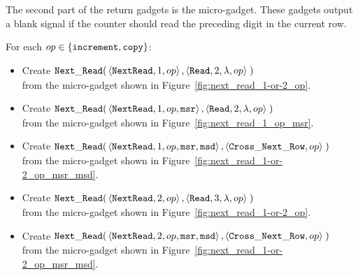 The second part of the return gadgets is the {\readnext} micro-gadget. These gadgets output a blank {\cwrite}
signal if the counter should read the preceding digit in the current row.


For each $op\in \{ {\tt increment}, {\tt copy} \}$:
\begin{itemize}

    \item Create
    $\begin{aligned}[t]
        {\tt Next\_Read}(& \left\langle {\tt NextRead}, 1,          op \right\rangle,
                    \left\langle {\tt Read},     2, \lambda, op \right\rangle \;)
    \end{aligned}$\\from the micro-gadget shown in Figure~\ref{fig:next_read_1-or-2_op}.

    \item Create
    $\begin{aligned}[t]
        {\tt Next\_Read}(& \left\langle {\tt NextRead}, 1,          op, {\tt msr} \right\rangle,
                    \left\langle {\tt Read},     2, \lambda, op            \right\rangle \;)
    \end{aligned}$\\from the micro-gadget shown in Figure~\ref{fig:next_read_1_op_msr}.

    \item Create
    $\begin{aligned}[t]
        {\tt Next\_Read}(& \left\langle {\tt NextRead}, 1,      op, {\tt msr}, {\tt msd} \right\rangle,
                    \left\langle {\tt Cross\_Next\_Row}, op                       \right\rangle \;)
    \end{aligned}$\\from the micro-gadget shown in Figure~\ref{fig:next_read_1-or-2_op_msr_msd}.


    \item Create
    $\begin{aligned}[t]
        {\tt Next\_Read}(& \left\langle {\tt NextRead}, 2,          op \right\rangle,
                    \left\langle {\tt Read},     3, \lambda, op \right\rangle \;)
    \end{aligned}$\\from the micro-gadget shown in Figure~\ref{fig:next_read_1-or-2_op}.

    \item Create
    $\begin{aligned}[t]
        {\tt Next\_Read}(& \left\langle {\tt NextRead}, 2,      op, {\tt msr}, {\tt msd} \right\rangle,
                    \left\langle {\tt Cross\_Next\_Row}, op                       \right\rangle \;)
    \end{aligned}$\\from the micro-gadget shown in Figure~\ref{fig:next_read_1-or-2_op_msr_msd}.



\end{itemize}

